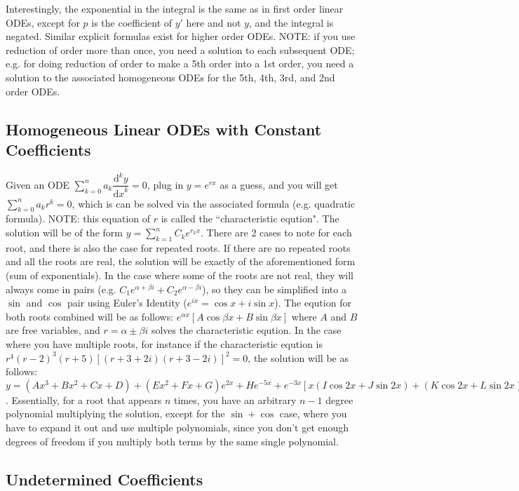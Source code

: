 \documentclass[12pt]{article}
\newcommand \dstyle \displaystyle
\renewcommand \d [1] {\mathrm{d}{#1}}
\newcommand \dx {{\d x}}
\newcommand \ndydx [1] {\dfrac{\mathrm{d}^{#1} y}{\dx^{#1}}}
\begin{document}
Interestingly, the exponential in the integral is the same as in first order linear ODEs, except for $p$ is the coefficient of $y'$ here and not $y$, and the integral is negated. Similar explicit formulas exist for higher order ODEs. NOTE: if you use reduction of order more than once, you need a solution to each subsequent ODE; e.g. for doing reduction of order to make a 5th order into a 1st order, you need a solution to the associated homogeneous ODEs for the 5th, 4th, 3rd, and 2nd order ODEs.

\subsection{Homogeneous Linear ODEs with Constant Coefficients}
Given an ODE $\dstyle \sum_{k=0}^n a_k \ndydx k = 0$, plug in $y = e^{r x}$ as a guess, and you will get $\dstyle \sum_{k=0}^n a_k r^k = 0$, which is can be solved via the associated formula (e.g. quadratic formula). NOTE: this equation of $r$ is called the ``characteristic eqution". The solution will be of the form $\dstyle y = \sum_{k=1}^n C_k e^{r_k x}$. There are 2 cases to note for each root, and there is also the case for repeated roots. If there are no repeated roots and all the roots are real, the solution will be exactly of the aforementioned form (sum of exponentials). In the case where some of the roots are not real, they will always come in pairs (e.g. $\dstyle C_1 e^{\alpha + \beta i} + C_2 e^{\alpha - \beta i}$), so they can be simplified into a $\sin$ and $\cos$ pair using Euler's Identity ($\dstyle e^{ix} = \cos x + i \sin x$). The eqution for both roots combined will be as follows: $\dstyle e^{\alpha x} \left[A \cos \beta x + B \sin \beta x\right]$ where $A$ and $B$ are free variables, and $r = \alpha \pm \beta i$ solves the characteristic eqution. In the case where you have multiple roots, for instance if the characteristic eqution is $r^4 (r - 2)^3 (r + 5) \left[(r + 3 + 2i) (r + 3 - 2i) \right]^2 = 0$, the solution will be as follows: $y = (A x^3 + B x^2 + C x + D) + (E x^2 + F x + G) e^{2 x} + H e^{-5 x} + e^{-3 x}\left[x (I \cos 2x + J \sin 2x) + (K \cos 2x + L \sin 2x)\right]$. Essentially, for a root that appears $n$ times, you have an arbitrary $n - 1$ degree polynomial multiplying the solution, except for the $\sin + \cos$ case, where you have to expand it out and use multiple polynomials, since you don't get enough degrees of freedom if you multiply both terms by the same single polynomial.


\subsection{Undetermined Coefficients}
\end{document}
